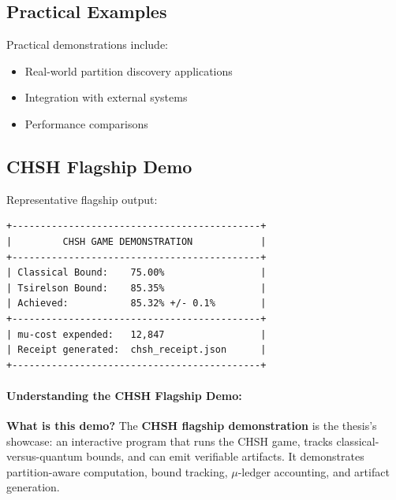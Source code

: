 \subsection{Practical Examples}

Practical demonstrations include:
\begin{itemize}
    \item Real-world partition discovery applications
    \item Integration with external systems
    \item Performance comparisons
\end{itemize}

\subsection{CHSH Flagship Demo}

Representative flagship output:
\begin{lstlisting}
+--------------------------------------------+
|         CHSH GAME DEMONSTRATION            |
+--------------------------------------------+
| Classical Bound:    75.00%                 |
| Tsirelson Bound:    85.35%                 |
| Achieved:           85.32% +/- 0.1%        |
+--------------------------------------------+
| mu-cost expended:   12,847                 |
| Receipt generated:  chsh_receipt.json      |
+--------------------------------------------+
\end{lstlisting}

\paragraph{Understanding the CHSH Flagship Demo:}

\textbf{What is this demo?} The \textbf{CHSH flagship demonstration} is the thesis's showcase: an interactive program that runs the CHSH game, tracks classical-versus-quantum bounds, and can emit verifiable artifacts. It demonstrates partition-aware computation, bound tracking, $\mu$-ledger accounting, and artifact generation.

